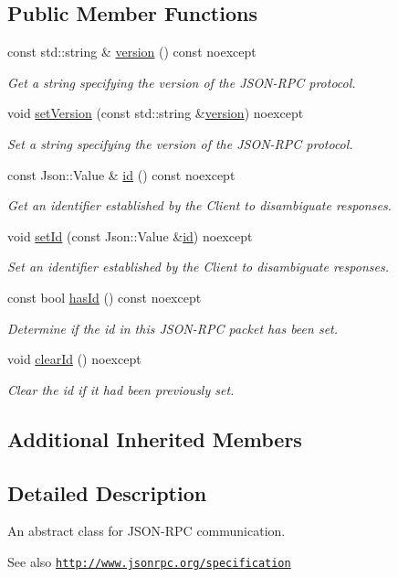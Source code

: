 \subsection*{Public Member Functions}
\begin{DoxyCompactItemize}
\item 
const std\+::string \& \hyperlink{group___network_module_ga57b18a1db26df83b5d1769b6101ee67f}{version} () const noexcept
\begin{DoxyCompactList}\small\item\em Get a string specifying the version of the J\+S\+O\+N-\/\+R\+PC protocol. \end{DoxyCompactList}\item 
void \hyperlink{group___network_module_ga7bfca4f17a0916e6f1313b04496b9e0d}{set\+Version} (const std\+::string \&\hyperlink{group___network_module_ga57b18a1db26df83b5d1769b6101ee67f}{version}) noexcept
\begin{DoxyCompactList}\small\item\em Set a string specifying the version of the J\+S\+O\+N-\/\+R\+PC protocol. \end{DoxyCompactList}\item 
const Json\+::\+Value \& \hyperlink{group___network_module_ga76f1d35ffeff40b5df1874c68b97c89a}{id} () const noexcept
\begin{DoxyCompactList}\small\item\em Get an identifier established by the Client to disambiguate responses. \end{DoxyCompactList}\item 
void \hyperlink{group___network_module_gaf71b65c7bb55adbf936c38ffd1cd8289}{set\+Id} (const Json\+::\+Value \&\hyperlink{group___network_module_ga76f1d35ffeff40b5df1874c68b97c89a}{id}) noexcept
\begin{DoxyCompactList}\small\item\em Set an identifier established by the Client to disambiguate responses. \end{DoxyCompactList}\item 
const bool \hyperlink{group___network_module_gaef8ff7e1ae84dc613d31615fa973a521}{has\+Id} () const noexcept
\begin{DoxyCompactList}\small\item\em Determine if the id in this J\+S\+O\+N-\/\+R\+PC packet has been set. \end{DoxyCompactList}\item 
void \hyperlink{group___network_module_gaa92eeabe2c022b96d2820a02118dc1b2}{clear\+Id} () noexcept
\begin{DoxyCompactList}\small\item\em Clear the id if it had been previously set. \end{DoxyCompactList}\end{DoxyCompactItemize}
\subsection*{Additional Inherited Members}


\subsection{Detailed Description}
An abstract class for J\+S\+O\+N-\/\+R\+PC communication. 

\begin{DoxySeeAlso}{See also}
\href{http://www.jsonrpc.org/specification}{\tt http\+://www.\+jsonrpc.\+org/specification} 
\end{DoxySeeAlso}
